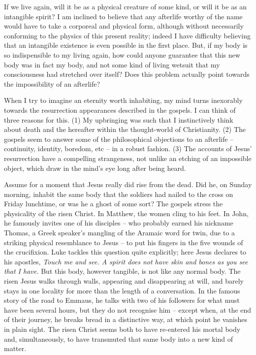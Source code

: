 \prosesep

If we live again, will it be as a physical creature of some kind, or will it be as an intangible spirit? I am inclined to believe that any afterlife worthy of the name would have to take a corporeal and physical form, although without necessarily conforming to the physics of this present reality; indeed I have difficulty believing that an intangible existence is even possible in the first place. But, if my body is so indispensible to my living again, how could anyone guarantee that this new body was in fact my body, and not some kind of living wetsuit that my consciousness had stretched over itself? Does this problem actually point towards the impossibility of an afterlife?

\prosesep

When I try to imagine an eternity worth inhabiting, my mind turns inexorably towards the resurrection appearances described in the gospels. I can think of three reasons for this. (1) My upbringing was such that I instinctively think about death and the hereafter within the thought-world of Christianity. (2) The gospels seem to answer some of the philosophical objections to an afterlife -- continuity, identity, boredom, etc -- in a robust fashion. (3) The accounts of Jesus' resurrection have a compelling strangeness, not unlike an etching of an impossible object, which draw in the mind's eye long after being heard.

Assume for a moment that Jesus really did rise from the dead. Did he, on Sunday morning, inhabit the same body that the soldiers had nailed to the cross on Friday lunchtime, or was he a ghost of some sort? The gospels stress the physicality of the risen Christ. In Matthew, the women cling to his feet. In John, he famously invites one of his disciples -- who probably earned his nickname Thomas, a Greek speaker's mangling of the Aramaic word for twin, due to a striking physical resemblance to Jesus -- to put his fingers in the five wounds of the crucifixion. Luke tackles this question quite explicitly; here Jesus declares to his apostles, \textit{Touch me and see. A spirit does not have skin and bones as you see that I have.} But this body, however tangible, is not like any normal body. The risen Jesus walks through walls, appearing and disappearing at will, and barely stays in one locality for more than the length of a conversation. In the famous story of the road to Emmaus, he talks with two of his followers for what must have been several hours, but they do not recognise him -- except when, at the end of their journey, he breaks bread in a distinctive way, at which point he vanishes in plain sight. The risen Christ seems both to have re-entered his mortal body and, simultaneously, to have transmuted that same body into a new kind of matter.

